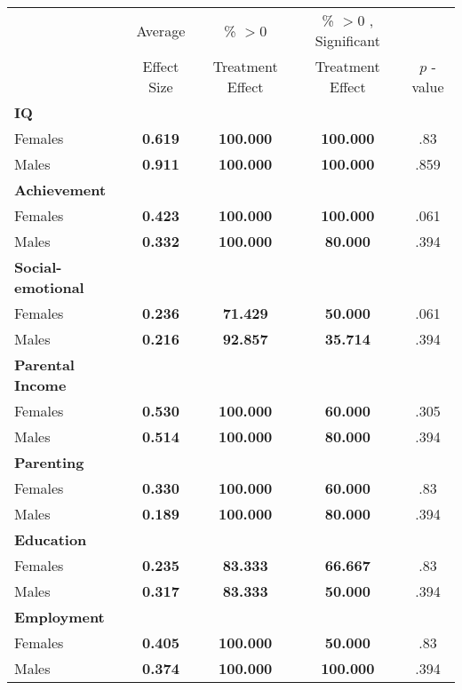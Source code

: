\begin{tabular}{l c c c c}
\toprule
 & Average & \% $ >0 $ & \% $ >0 $ , Significant & \citet{Rosenbaum_2005_Distribution_JRSS} \\
 & Effect Size & Treatment Effect & Treatment Effect & $ p $ -value \\
\midrule
\textbf{IQ} & & & & \\
\quad Females &  \textbf{    0.619} & \textbf{  100.000} & \textbf{  100.000} & .83 \\
\quad Males &  \textbf{    0.911} & \textbf{  100.000} & \textbf{  100.000} & .859 \\
\midrule
\textbf{Achievement} & & & & \\
\quad Females &  \textbf{    0.423} & \textbf{  100.000} & \textbf{  100.000} & .061 \\
\quad Males &  \textbf{    0.332} & \textbf{  100.000} & \textbf{   80.000} & .394 \\
\midrule
\textbf{Social-emotional} & & & & \\
\quad Females &  \textbf{    0.236} & \textbf{   71.429} & \textbf{   50.000} & .061 \\
\quad Males &  \textbf{    0.216} & \textbf{   92.857} & \textbf{   35.714} & .394 \\
\midrule
\textbf{Parental Income} & & & & \\
\quad Females &  \textbf{    0.530} & \textbf{  100.000} & \textbf{   60.000} & .305 \\
\quad Males &  \textbf{    0.514} & \textbf{  100.000} & \textbf{   80.000} & .394 \\
\midrule
\textbf{Parenting} & & & & \\
\quad Females &  \textbf{    0.330} & \textbf{  100.000} & \textbf{   60.000} & .83 \\
\quad Males &  \textbf{    0.189} & \textbf{  100.000} & \textbf{   80.000} & .394 \\
\midrule
\textbf{Education} & & & & \\
\quad Females &  \textbf{    0.235} & \textbf{   83.333} & \textbf{   66.667} & .83 \\
\quad Males &  \textbf{    0.317} & \textbf{   83.333} & \textbf{   50.000} & .394 \\
\midrule
\textbf{Employment} & & & & \\
\quad Females &  \textbf{    0.405} & \textbf{  100.000} & \textbf{   50.000} & .83 \\
\quad Males &  \textbf{    0.374} & \textbf{  100.000} & \textbf{  100.000} & .394 \\

\end{tabular}
